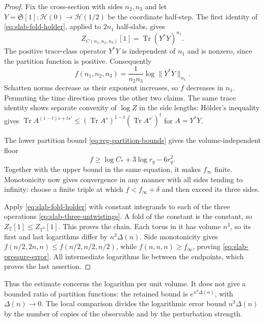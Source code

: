 \begin{proof}
Fix the cross-section with sides $n_2,n_3$ and let
$Y=\mathfrak S[1]:\mathcal H(0)\to\mathcal H(1/2)$ be the coordinate
half-step. The first identity of \eqref{eq:slab-fold-holder}, applied
to $2n_1$ half-slabs, gives
\begin{equation}\label{eq:slab-pressure-trace}
 Z_{C(n_1,n_2,n_3)}[1]=\operatorname{Tr}(Y^*Y)^{n_1}.
\end{equation}
The positive trace-class operator $Y^*Y$ is independent of $n_1$ and
is nonzero, since the partition function is positive. Consequently
\[
 f(n_1,n_2,n_3)=\frac1{n_2n_3}\log\|Y^*Y\|_{n_1}.
\]
Schatten norms decrease as their exponent increases, so $f$ decreases
in $n_1$. Permuting the time direction proves the other two claims.
The same trace identity shows separate convexity of $\log Z$ in the
side lengths: H\"older's inequality gives
$\operatorname{Tr}A^{(1-t)s+ts'}\le
 (\operatorname{Tr}A^s)^{1-t}(\operatorname{Tr}A^{s'})^t$ for $A=Y^*Y$.

The lower partition bound \eqref{eq:reg-partition-bounds} gives the
volume-independent floor
\[
 f\ge\log C_*+3\log r_q-6r_q^2.
\]
Together with the upper bound in the same equation, it makes
$f_\infty$ finite. Monotonicity now gives convergence in any manner
with all sides tending to infinity: choose a finite triple at which
$f<f_\infty+\delta$ and then exceed its three sides.

Apply \eqref{eq:slab-fold-holder} with constant integrands to each of
the three operations \eqref{eq:slab-three-untwistings}. A fold of
the constant is the constant, so $Z_{\mathbb T}[1]\le Z_{\mathbb T^0}[1]$.
This proves the chain. Each torus in it has volume $n^3$, so its first
and last logarithms differ by $n^3\Delta(n)$. Side monotonicity gives
$f(n/2,2n,n)\le f(n/2,n/2,n/2)$, while
$f(n,n,n)\ge f_\infty$, proving \eqref{eq:slab-pressure-error}.
All intermediate logarithms lie between the endpoints, which proves
the last assertion.
\end{proof}

Thus the estimate concerns the logarithm per unit volume. It does not
give a bounded ratio of partition functions: the retained bound is
$e^{n^3\Delta(n)}$, with $\Delta(n)\to0$. The local comparison
divides the logarithmic error bound $n^3\Delta(n)$ by the number of
copies of the observable and by the perturbation strength.

